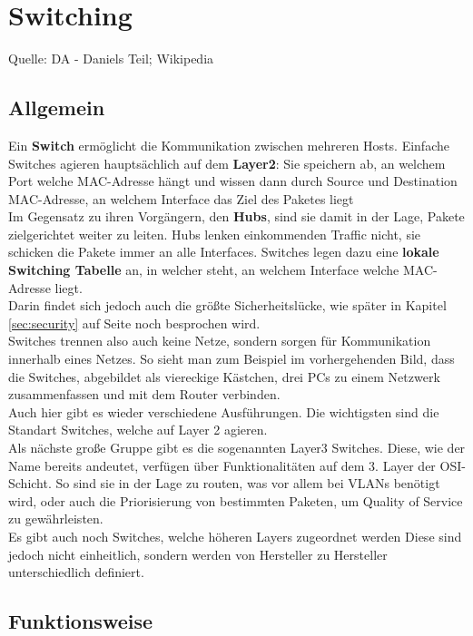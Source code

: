 \chapter{Switching}
Quelle: DA - Daniels Teil; Wikipedia
\section{Allgemein}
Ein \textbf{Switch} ermöglicht die Kommunikation zwischen mehreren Hosts. Einfache Switches agieren hauptsächlich auf dem \textbf{Layer2}: Sie speichern ab, an welchem Port welche MAC-Adresse hängt und wissen dann durch Source und Destination MAC-Adresse, an welchem Interface das Ziel des Paketes liegt\\

Im Gegensatz zu ihren Vorgängern, den \textbf{Hubs}, sind sie damit in der Lage, Pakete zielgerichtet weiter zu leiten. Hubs lenken einkommenden Traffic nicht, sie schicken die Pakete immer an alle Interfaces. Switches legen dazu eine \textbf{lokale Switching Tabelle} an, in welcher steht, an welchem Interface welche MAC-Adresse liegt.\\
Darin findet sich jedoch auch die größte Sicherheitslücke, wie später in Kapitel \ref{sec:security} auf Seite \pageref{sec:security} noch besprochen wird.\\

Switches trennen also auch keine Netze, sondern sorgen für Kommunikation innerhalb eines Netzes. So sieht man zum Beispiel im vorhergehenden Bild, dass die Switches, abgebildet als viereckige Kästchen, drei PCs zu einem Netzwerk zusammenfassen und mit dem Router verbinden.\\

Auch hier gibt es wieder verschiedene Ausführungen. Die wichtigsten sind die Standart Switches, welche auf Layer 2 agieren.\\
Als nächste große Gruppe gibt es die sogenannten Layer3 Switches. Diese, wie der Name bereits andeutet, verfügen über Funktionalitäten auf dem 3. Layer der OSI-Schicht. So sind sie in der Lage zu routen, was vor allem bei VLANs benötigt wird, oder auch die Priorisierung von bestimmten Paketen, um Quality of Service zu gewährleisten.\\
Es gibt auch noch Switches, welche höheren Layers zugeordnet werden Diese sind jedoch nicht einheitlich, sondern werden von Hersteller zu Hersteller unterschiedlich definiert.

\section{Funktionsweise}
